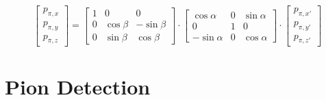 \documentclass[a4paper,parskip,11pt, DIV12]{scrreprt}
\begin{document}
	\begin{equation}
	\begin{bmatrix}
	p_{\pi,x} \\ p_{\pi,y} \\ p_{\pi,z}
	\end{bmatrix}
	=
	\begin{bmatrix}
	1 &   0         & 0           \\
	0 & \cos \beta & -\sin \beta \\
	0 & \sin \beta &  \cos \beta
	\end{bmatrix}
	\cdot
	\begin{bmatrix}
	\cos \alpha  & 0 & \sin \alpha \\
	0         & 1 &  0          \\
	-\sin \alpha & 0 & \cos \alpha
	\end{bmatrix}
	\cdot
	\begin{bmatrix}
	p_{\pi,x'} \\ p_{\pi,y'} \\ p_{\pi,z'}
	\end{bmatrix}
	\end{equation}
	
	\clearpage
	
	
	\section{Pion Detection} \label{sec:pdetection}
	
\end{document}
